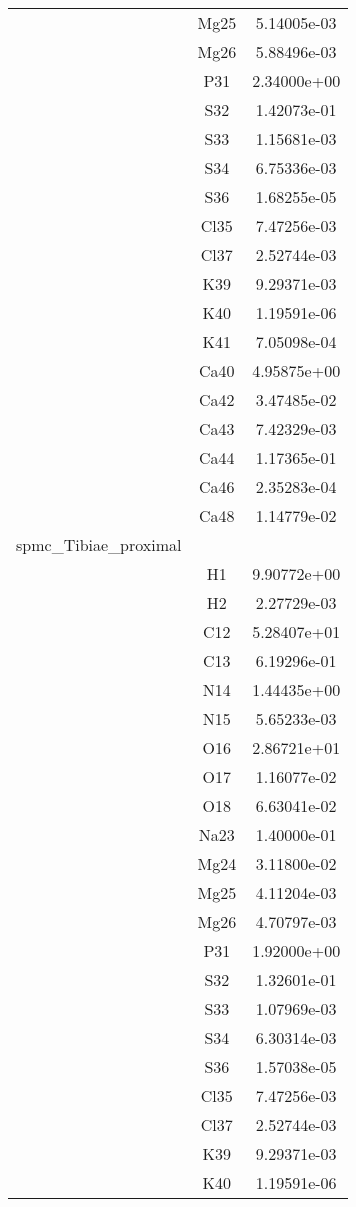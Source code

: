 \begin{centering}
\begin{longtable}{l c c}
& Mg25 & 5.14005e-03 \\ 
& Mg26 & 5.88496e-03 \\ 
& P31 & 2.34000e+00 \\ 
& S32 & 1.42073e-01 \\ 
& S33 & 1.15681e-03 \\ 
& S34 & 6.75336e-03 \\ 
& S36 & 1.68255e-05 \\ 
& Cl35 & 7.47256e-03 \\ 
& Cl37 & 2.52744e-03 \\ 
& K39 & 9.29371e-03 \\ 
& K40 & 1.19591e-06 \\ 
& K41 & 7.05098e-04 \\ 
& Ca40 & 4.95875e+00 \\ 
& Ca42 & 3.47485e-02 \\ 
& Ca43 & 7.42329e-03 \\ 
& Ca44 & 1.17365e-01 \\ 
& Ca46 & 2.35283e-04 \\ 
& Ca48 & 1.14779e-02 \\ 
\hline
spmc_Tibiae_proximal & & \\
\hline
& H1 & 9.90772e+00 \\ 
& H2 & 2.27729e-03 \\ 
& C12 & 5.28407e+01 \\ 
& C13 & 6.19296e-01 \\ 
& N14 & 1.44435e+00 \\ 
& N15 & 5.65233e-03 \\ 
& O16 & 2.86721e+01 \\ 
& O17 & 1.16077e-02 \\ 
& O18 & 6.63041e-02 \\ 
& Na23 & 1.40000e-01 \\ 
& Mg24 & 3.11800e-02 \\ 
& Mg25 & 4.11204e-03 \\ 
& Mg26 & 4.70797e-03 \\ 
& P31 & 1.92000e+00 \\ 
& S32 & 1.32601e-01 \\ 
& S33 & 1.07969e-03 \\ 
& S34 & 6.30314e-03 \\ 
& S36 & 1.57038e-05 \\ 
& Cl35 & 7.47256e-03 \\ 
& Cl37 & 2.52744e-03 \\ 
& K39 & 9.29371e-03 \\ 
& K40 & 1.19591e-06 \\ 

\end{longtable}
\end{centering}
